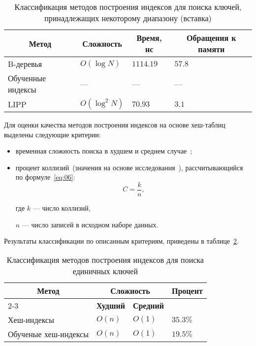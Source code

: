 {
\captionsetup{format=hang,justification=raggedright,
              singlelinecheck=off,width=16.8cm}
\begin{longtable}[Hc]{|p{5cm}|p{2cm}|p{2cm}|p{2cm}|}
\caption{Классификация методов построения индексов для поиска ключей,
принадлежащих некоторому диапазону (вставка)\label{tab:02}}\\
    \hline
    \multicolumn{1}{|c}{\textbf{Метод}} &
    \multicolumn{1}{|c|}{\textbf{Сложность}} &
    \multicolumn{1}{|c|}{\textbf{Время, нс}} &
    \multicolumn{1}{c|}{\parbox{3cm}{\vspace{2mm}\centering\textbf{Обращения к
    памяти}}}\\[2.5ex]
    \hline
    B-деревья
    & $O(\log N)$
    & $1114.19$
    & $57.8$\\
    \hline
    Обученные индексы
    & ---
    & ---
    & ---\\
    \hline
    LIPP 
    & $O(\log^2 N)$
    & $70.93$
    & $3.1$\\
    \hline
\end{longtable}
}

Для оценки качества методов построения индексов на основе хеш-таблиц выделены
следующие критерии:
\begin{itemize}
    \item временная сложность поиска в худшем и среднем случае~\cite{main,
        squares};
    \item процент коллизий~(значения на основе исследования~\cite{main}),
        рассчитывающийся по формуле~\eqref{eq:06}:
        \begin{equation}\label{eq:06}
            C = \frac{k}{n},
        \end{equation}
        
      где $k$ --- число коллизий,
      
      $n$ --- число записей в исходном наборе данных.
\end{itemize}

Результаты классификации по описанным критериям, приведены в таблице~\ref{tab:03}.

{
\captionsetup{format=hang,justification=raggedleft,
              singlelinecheck=off,width=13.3cm}
\begin{longtable}[Hc]{|p{5.3cm}|p{2cm}|p{2cm}|p{2cm}|}
\caption{Классификация методов построения индексов для поиска единичных
ключей\label{tab:03}}\\
    \hline
    \multicolumn{1}{|c|}{\multirow{2}{*}{\textbf{Метод}}} &
    \multicolumn{2}{c|}{\textbf{Сложность}} &
    \multicolumn{1}{c|}{\multirow{2}{*}{\parbox{2cm}{\textbf{Процент}}}}\\
    \cline{2-3}
    & \multicolumn{1}{c|}{\textbf{Худший}}
    & \multicolumn{1}{c|}{\textbf{Средний}}
    &\\
    \hline
    Хеш-индексы
    & $O(n)$
    & $O(1)$
    & $35.3\%$\\
    \hline
    Обученые хеш-индексы
    & $O(n)$
    & $O(1)$
    & $19.5\%$\\
    \hline
\end{longtable}
}


